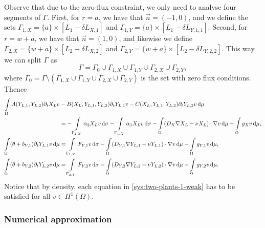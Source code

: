\documentclass[11pt]{article}
\begin{document}
Observe that due to the zero-flux constraint, we only need to analyse four segments of $\Gamma$. First, for \( r = a\), we have that \(\vec{n} = (-1,0)\), and we define the sets \( \Gamma_{1, X} = \{a\} \times [L_1 - \delta L_{X,1}]\) and 
\( \Gamma_{1, Y} = \{a\} \times [L_1 - \delta L_{Y,1,1}]\). Second, for \(r = w+a\), we have that \(\vec{n} = (1,0)\), and likewise we define \( \Gamma_{2, X} = \{w+a\} \times [L_2 - \delta L_{X,2}]\) and \( \Gamma_{2, Y} = \{w+a\} \times [L_2 - \delta L_{Y,2,2}]\). This way we can split \(\Gamma\) as 
\[ 
    \Gamma = \Gamma_0 \cup \Gamma_{1, X} \cup \Gamma_{1, Y} \cup \Gamma_{2, X} \cup \Gamma_{2,Y},
\]
where \( \Gamma_0 = \Gamma \setminus (\bar{\Gamma}_{1, X} \cup \bar{\Gamma}_{1, Y} \cup \bar{\Gamma}_{2, X} \cup \bar{\Gamma}_{2,Y}) \) is the set with zero flux conditions.
Thence
\begin{subequations}
\label{sys:two-plants-1-weak}
\begin{align}
    \int\limits_\Omega
    A(Y_{L,1}, Y_{L,2}) \partial_t X_L v &- B(X_L, Y_{L,1}, Y_{L,2}) \partial_t Y_{L,1} v - C(X_L, Y_{L,1}, Y_{L,2}) \partial_t Y_{L,2} v \dif \mu 
    \notag
    \\
    &=
    -\int\limits_{\Gamma_{2,X}}  \alpha_2 X_L v \dif \sigma
    - \int\limits_{\Gamma_{1,X}} \alpha_1 X_L v \dif \sigma
    -\int\limits_\Omega
    (D_X \nabla X_L - \nu X_L) \cdot \nabla v  \dif \mu
    -\int\limits_\Omega g_X v \dif \mu,
    \\
    \int\limits_\Omega (\theta + b_{Y,1}) \partial_t Y_{L,1} v \dif \mu  &=
    \int\limits_{\Gamma_{1,Y}} F_{Y,1} v \dif\sigma
    -\int\limits_\Omega (D_{Y,1} \nabla Y_{L,1} - \nu Y_{L,1}) \cdot \nabla v \dif\mu - \int\limits_\Omega g_{Y,1} v \dif\mu,
    \\
    \int\limits_\Omega (\theta + b_{Y,2}) \partial_t Y_{L,2} v \dif\mu  &= \int\limits_{\Gamma_{2,Y}} F_{Y,2} v \dif\sigma - 
    \int\limits_\Omega (D_{Y,2} \nabla Y_{L,2} - \nu Y_{L,2}) \cdot \nabla v \dif\mu - \int\limits_\Omega g_{Y,2} v \dif\mu.
\end{align}
\end{subequations}
Notice that by density, each equation in \eqref{sys:two-plants-1-weak} has to be satisfied for all \(v\in H^1(\Omega)\).


\subsubsection{Numerical approximation}
\end{document}

